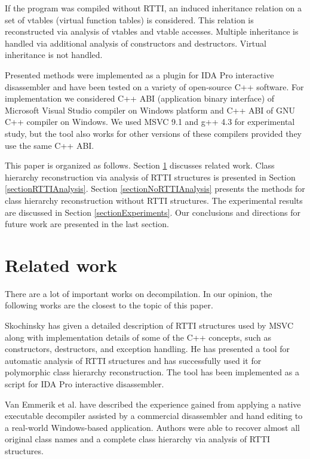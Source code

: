 \documentclass[10pt, conference]{IEEEtran}
\begin{document}
If the program was compiled without RTTI,
an induced inheritance relation on
a set of vtables (virtual function tables) is considered.
This relation is reconstructed via analysis of vtables and vtable accesses.
Multiple inheritance is handled via additional analysis of
constructors and destructors.
Virtual inheritance is not handled.

Presented methods were implemented as a plugin for IDA Pro 
interactive disassembler \cite{ida} and have been tested on a variety
of open-source C++ software.
For implementation we considered C++ ABI
(application binary interface) of Microsoft Visual Studio
compiler on Windows platform and C++ ABI
of GNU C++ compiler on Windows. We used MSVC 9.1 and g++ 4.3
for experimental study, but the tool also works for
other versions of these compilers provided they use the same C++ ABI.

This paper is organized as follows. Section
\ref{sectionRelatedWork} discusses related work.
Class hierarchy reconstruction via analysis of RTTI structures
is presented in Section \ref{sectionRTTIAnalysis}.
Section \ref{sectionNoRTTIAnalysis} presents the methods for class
hierarchy reconstruction without RTTI structures.
The experimental results are discussed in Section \ref{sectionExperiments}.
Our conclusions and directions for future work are
presented in the last section.




\quad

\section{Related work}
\label{sectionRelatedWork}
There are a lot of important works on decompilation.
In our opinion,
the following works are the closest to the topic of this paper.

Skochinsky \cite{skochinsky06} has given a detailed description
of RTTI structures used by MSVC
along with implementation details of some of the C++ concepts,
such as constructors, destructors, and exception handling.
He has presented a tool for automatic analysis of RTTI structures
and has successfully used it for polymorphic class hierarchy
reconstruction. The tool has been implemented as a script for IDA Pro
interactive disassembler.

Van Emmerik et al. \cite{emmerik04} have described
the experience gained from applying
a native executable decompiler
assisted by a commercial disassembler and hand editing
to a real-world Windows-based application.
Authors were able to recover almost all original class names
and a complete class hierarchy via analysis of RTTI structures.
\end{document}
